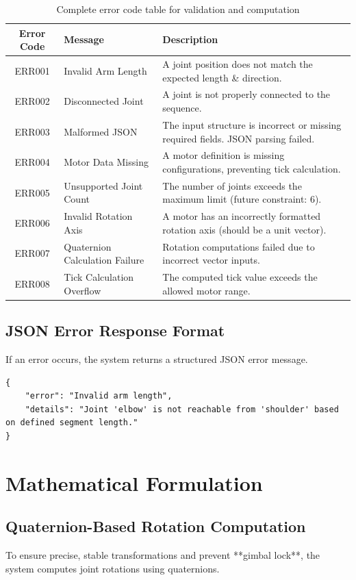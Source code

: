 \documentclass{article}
\begin{document}
\begin{table}[H]
\centering
\begin{tabular}{|c|l|p{8cm}|}
\hline
\textbf{Error Code} & \textbf{Message} & \textbf{Description} \\
\hline
ERR001 & Invalid Arm Length & A joint position does not match the expected length \& direction. \\
\hline
ERR002 & Disconnected Joint & A joint is not properly connected to the sequence. \\
\hline
ERR003 & Malformed JSON & The input structure is incorrect or missing required fields. JSON parsing failed. \\
\hline
ERR004 & Motor Data Missing & A motor definition is missing configurations, preventing tick calculation. \\
\hline
ERR005 & Unsupported Joint Count & The number of joints exceeds the maximum limit (future constraint: 6). \\
\hline
ERR006 & Invalid Rotation Axis & A motor has an incorrectly formatted rotation axis (should be a unit vector). \\
\hline
ERR007 & Quaternion Calculation Failure & Rotation computations failed due to incorrect vector inputs. \\
\hline
ERR008 & Tick Calculation Overflow & The computed tick value exceeds the allowed motor range. \\
\hline
\end{tabular}
\caption{Complete error code table for validation and computation}
\end{table}

\subsection{JSON Error Response Format}
If an error occurs, the system returns a structured JSON error message.

\begin{verbatim}
{
    "error": "Invalid arm length",
    "details": "Joint 'elbow' is not reachable from 'shoulder' based on defined segment length."
}
\end{verbatim}

\section{Mathematical Formulation}
\subsection{Quaternion-Based Rotation Computation}
To ensure precise, stable transformations and prevent **gimbal lock**, the system computes joint rotations using quaternions.
\end{document}
